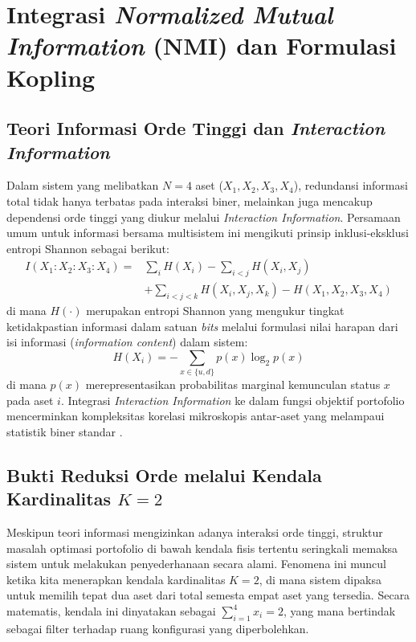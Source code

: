 \section{Integrasi \textit{Normalized Mutual Information} (NMI) dan Formulasi Kopling}

\subsection{Teori Informasi Orde Tinggi dan \textit{Interaction Information}}

Dalam sistem yang melibatkan $N=4$ aset ($X_1, X_2, X_3, X_4$), redundansi informasi total tidak hanya terbatas pada interaksi biner, melainkan juga mencakup dependensi orde tinggi yang diukur melalui \textit{Interaction Information}. Persamaan umum untuk informasi bersama multisistem ini mengikuti prinsip inklusi-eksklusi entropi Shannon sebagai berikut:
\begin{equation}
\begin{aligned}
I(X_1 : X_2 : X_3 : X_4) = &\sum_i H(X_i) - \sum_{i<j} H(X_i, X_j) \\
&+ \sum_{i<j<k} H(X_i, X_j, X_k) - H(X_1, X_2, X_3, X_4)
\end{aligned}
\label{eq:interaction_info_4}
\end{equation}
di mana $H(\cdot)$ merupakan entropi Shannon yang mengukur tingkat ketidakpastian informasi dalam satuan \textit{bits} melalui formulasi nilai harapan dari isi informasi (\textit{information content}) dalam sistem:
\begin{equation}
H(X_i) = -\sum_{x \in \{u, d\}} p(x) \log_2 p(x)
\end{equation}
di mana $p(x)$ merepresentasikan probabilitas marginal kemunculan status $x$ pada aset $i$. Integrasi \textit{Interaction Information} ke dalam fungsi objektif portofolio mencerminkan kompleksitas korelasi mikroskopis antar-aset yang melampaui statistik biner standar \cite{yang_abnormal_2024}.

\subsection{Bukti Reduksi Orde melalui Kendala Kardinalitas $K=2$}

Meskipun teori informasi mengizinkan adanya interaksi orde tinggi, struktur masalah optimasi portofolio di bawah kendala fisis tertentu seringkali memaksa sistem untuk melakukan penyederhanaan secara alami. Fenomena ini muncul ketika kita menerapkan kendala kardinalitas $K=2$, di mana sistem dipaksa untuk memilih tepat dua aset dari total semesta empat aset yang tersedia. Secara matematis, kendala ini dinyatakan sebagai $\sum_{i=1}^4 x_i = 2$, yang mana bertindak sebagai filter terhadap ruang konfigurasi yang diperbolehkan.

